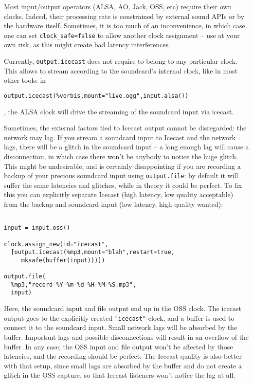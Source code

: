 Most input/output operators (ALSA, AO, Jack, OSS, etc)
require their own clocks. Indeed, their processing rate is constrained
by external sound APIs or by the hardware itself.
Sometimes, it is too much of an inconvenience,
in which case one can set \verb+clock_safe=false+ to allow
another clock assignment --
use at your own risk, as this might create bad latency interferences.

Currently, \verb+output.icecast+ does not require to belong
to any particular clock. This allows to stream according to the
soundcard's internal clock, like in most other tools:
in \begin{verbatim}
output.icecast(%vorbis,mount="live.ogg",input.alsa())
\end{verbatim}
,
the ALSA clock will drive the streaming of the soundcard input via
icecast.

Sometimes, the external factors tied to Icecast output cannot be
disregarded: the network may lag. If you stream a soundcard input
to Icecast and the network lags, there will be a glitch in the
soundcard input -- a long enough lag will cause a disconnection,
in which case there won't be anybody to notice the huge glitch.
This might be undesirable, and is certainly disappointing if you
are recording a backup of your precious soundcard input using
\verb+output.file+: by default it will suffer the same
latencies and glitches, while in theory it could be perfect.
To fix this you can explicitly separate Icecast (high latency,
low quality acceptable) from the backup and soundcard input (low latency,
high quality wanted):

\begin{verbatim}

input = input.oss()

clock.assign_new(id="icecast",
  [output.icecast(%mp3,mount="blah",restart=true,
     mksafe(buffer(input)))])

output.file(
  %mp3,"record-%Y-%m-%d-%H-%M-%S.mp3",
  input)
\end{verbatim}
Here, the soundcard input and file output end up in the OSS
clock. The icecast output
goes to the explicitly created \verb+"icecast"+ clock,
and a buffer is used to
connect it to the soundcard input. Small network lags will be
absorbed by the buffer. Important lags and possible disconnections
will result in an overflow of the buffer.
In any case, the OSS input and file output won't be affected
by those latencies, and the recording should be perfect.
The Icecast quality is also better with that setup,
since small lags are absorbed by the buffer and do not create
a glitch in the OSS capture, so that Icecast listeners won't
notice the lag at all.

